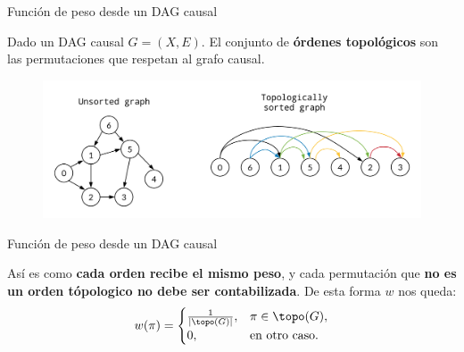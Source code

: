 \begin{frame}{Función de peso desde un DAG causal}
	
	Dado un DAG causal \(G=(X,E)\). El conjunto de \textbf{órdenes topológicos} son las permutaciones que respetan al grafo causal. %
	\begin{figure}
		\centering
		\includegraphics[width=0.9\linewidth]{pic/img/SHAP/topologicalSortExample.png}
	\end{figure}
\end{frame} 

\begin{frame}{Función de peso desde un DAG causal}
	
	Así es como \textbf{cada orden recibe el mismo peso}, y cada permutación que \textbf{no es un orden tópologico no debe ser contabilizada}. De esta forma $w$ nos queda:
	\[
	w(\pi)=
	\begin{cases}
		\displaystyle \tfrac1{|\topo(G)|},&\pi\in\topo(G),\\
		0,&\text{en otro caso.}
	\end{cases}
	\]
	
\end{frame}


